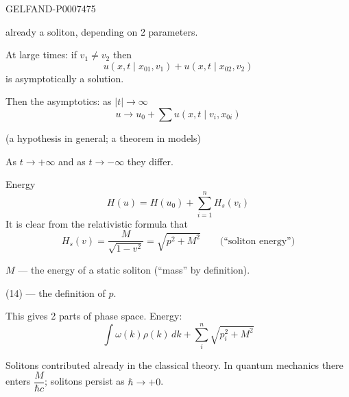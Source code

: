 \begin{GelfandAdjacentEvidence}{GELFAND-P000747}{5}


already a soliton, depending on 2 parameters.

At large times: if \(v_1\ne v_2\) then
\begin{equation*}
u(x,t\mid x_{01},v_1)+u(x,t\mid x_{02},v_2)
\tag{11}
\end{equation*}
is asymptotically a solution.

Then the asymptotics: as \(|t|\to\infty\)
\begin{equation*}
u\to u_0+\sum u(x,t\mid v_i,x_{0i})
\tag{12}
\end{equation*}
\end{GelfandAdjacentEvidence}


(a hypothesis in general; a theorem in models)

As \(t\to+\infty\) and as \(t\to-\infty\) they differ.

Energy
\begin{equation*}
H(u)=H(u_0)+\sum_{i=1}^{n}H_s(v_i)
\tag{13}
\end{equation*}
It is clear from the relativistic formula that
\begin{equation*}
H_s(v)=\frac{M}{\sqrt{1-v^2}}=\sqrt{p^2+M^2}
\qquad\text{(“soliton energy”)}
\tag{14}
\end{equation*}

\(M\) --- the energy of a static soliton (“mass” by definition).

(14) --- the definition of \(p\).

This gives 2 parts of phase space. Energy:
\begin{equation*}
\int\omega(k)\rho(k)\,dk+\sum_i^n\sqrt{p_i^2+M^2}
\tag{15}
\end{equation*}

Solitons contributed already in the classical theory. In quantum mechanics there enters \(\dfrac{M}{\hbar c}\);
solitons persist as \(\hbar\to+0\).


